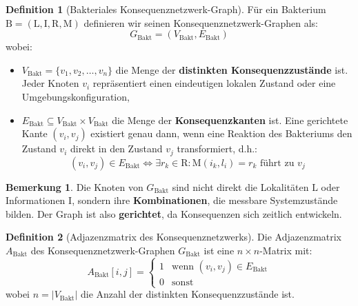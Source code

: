 \documentclass[a4paper,12pt]{article}
\theoremstyle{definition}
\newtheorem{definition}{Definition}
\newtheorem{bemerkung}{Bemerkung}
\begin{document}
\begin{definition}[Bakteriales Konsequenznetzwerk-Graph]
\label{def:konsequenzgraph}
Für ein Bakterium $\text{B} = (\text{L}, \text{I}, \text{R}, \text{M})$ definieren wir seinen Konsequenznetzwerk-Graphen als:
\[
G_{\text{Bakt}} = (V_{\text{Bakt}}, E_{\text{Bakt}})
\]
wobei:
\begin{itemize}
    \item[-] $V_{\text{Bakt}} = \{v_1, v_2, \ldots, v_n\}$ die Menge der \textbf{distinkten Konsequenzzustände} ist. Jeder Knoten $v_i$ repräsentiert einen eindeutigen lokalen Zustand oder eine Umgebungskonfiguration,
    
    \item[-] $E_{\text{Bakt}} \subseteq V_{\text{Bakt}} \times V_{\text{Bakt}}$ die Menge der \textbf{Konsequenzkanten} ist. Eine gerichtete Kante $(v_i, v_j)$ existiert genau dann, wenn eine Reaktion des Bakteriums den Zustand $v_i$ direkt in den Zustand $v_j$ transformiert, d.h.:
    \[
    (v_i, v_j) \in E_{\text{Bakt}} \iff \exists r_k \in \text{R}: \text{M}(i_k, l_i) = r_k \text{ führt zu } v_j
    \]
\end{itemize}
\end{definition}

\begin{bemerkung}
Die Knoten von $G_{\text{Bakt}}$ sind nicht direkt die Lokalitäten $\text{L}$ oder Informationen $\text{I}$, sondern ihre \textbf{Kombinationen}, die messbare Systemzustände bilden. Der Graph ist also \textbf{gerichtet}, da Konsequenzen sich zeitlich entwickeln.
\end{bemerkung}

\begin{definition}[Adjazenzmatrix des Konsequenznetzwerks]
Die Adjazenzmatrix $A_{\text{Bakt}}$ des Konsequenznetzwerk-Graphen $G_{\text{Bakt}}$ ist eine $n \times n$-Matrix mit:
\[
A_{\text{Bakt}}[i,j] = \begin{cases}
1 & \text{wenn } (v_i, v_j) \in E_{\text{Bakt}} \\
0 & \text{sonst}
\end{cases}
\]
wobei $n = |V_{\text{Bakt}}|$ die Anzahl der distinkten Konsequenzzustände ist.
\end{definition}
\end{document}
